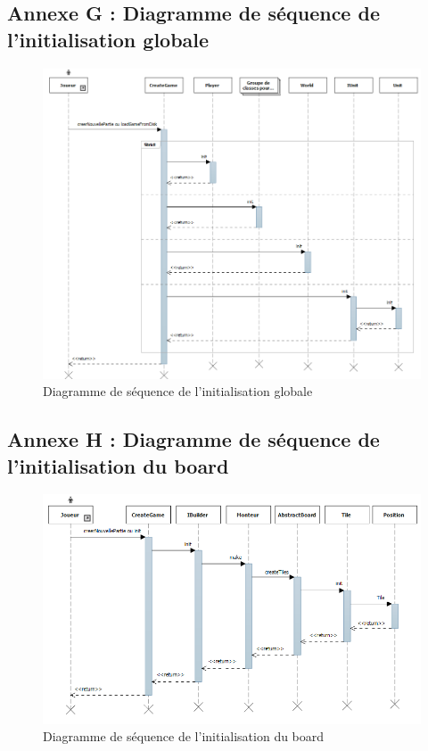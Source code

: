 \subsection{Annexe G : Diagramme de séquence de l'initialisation globale}
\begin{figure}[!h]
\centering
\includegraphics[width=1.1\textwidth]{img/InitAll.png}
\caption{Diagramme de séquence de l'initialisation globale}
\end{figure}
\clearpage

\subsection{Annexe H : Diagramme de séquence de l'initialisation du board}
\begin{figure}[!h]
\centering
\includegraphics[width=1.1\textwidth]{img/InitBoard.png}
\caption{Diagramme de séquence de l'initialisation du board}
\end{figure}
\clearpage


